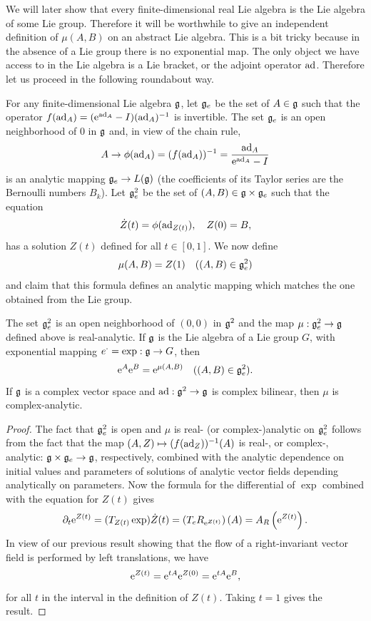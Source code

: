 We will later show that every finite-dimensional real Lie algebra is the Lie algebra of some Lie group. Therefore it will be worthwhile to give an independent definition of $\mu(A,B)$ on an abstract Lie algebra. This is a bit tricky because in the absence of a Lie group there is no exponential map. The only object we have access to in the Lie algebra is a Lie bracket, or the adjoint operator $\mathrm{ad}$. Therefore let us proceed in the following roundabout way.

For any finite-dimensional Lie algebra $\mathfrak{g}$, let $\mathfrak{g}_e$ be the set of $A\in \mathfrak{g}$ such that the operator $f(\mathrm{ad}_A)=(\mathrm{e}^{\mathrm{ad}_A}-I)(\mathrm{ad}_A)^{-1}$ is invertible. The set $\mathfrak{g}_e$ is an open neighborhood of $0$ in $\mathfrak{g}$ and, in view of the chain rule,
\[A\to \phi(\mathrm{ad}_A)=(f(\mathrm{ad}_A))^{-1}=\frac{\mathrm{ad}_A}{\mathrm{e}^{\mathrm{ad}_A}-I}\]
is an analytic mapping $\mathfrak{g}_e\to \boldsymbol{\mathrm{\mathrm}}{L}(\mathfrak{g})$ (the coefficients of its Taylor series are the Bernoulli numbers $B_k$). Let $\mathfrak{g}_e^2$ be the set of $(A,B)\in \mathfrak{g}\times\mathfrak{g}_e$ such that the equation
\[\dot Z(t)=\phi(\mathrm{ad}_{Z(t)}),\quad Z(0)=B,\label{eq Z(t)}\]
has a solution $Z(t)$ defined for all $t\in [0,1]$. We now define
\[\mu(A,B)=Z(1)\quad ((A,B)\in\mathfrak{g}_e^2) \label{def local mu}\]
and claim that this formula defines an analytic mapping which matches the one obtained from the Lie group.


\begin{thm}[{{\cite[Thm.~1.6.1]{DK}}}]
    The set $\mathfrak{g}_e^2$ is an open neighborhood of $(0,0)$ in $\mathfrak{g}^2$ and the map $\mu:\mathfrak{g}_e^2\to \mathfrak{g}$ defined above is real-analytic. If $\mathfrak{g}$ is the Lie algebra of a Lie group $G$, with exponential mapping $e^\cdot=\exp:\mathfrak{g}\to G$, then
    \[\mathrm{e}^A \mathrm{e}^B=\mathrm{e}^{\mu(A,B)}\quad ((A,B)\in\mathfrak{g}_e^2).\]
    If $\mathfrak{g}$ is a complex vector space and $\mathrm{ad}:\mathfrak{g}^2\to \mathfrak{g}$ is complex bilinear, then $\mu$ is complex-analytic.
\end{thm}
\begin{proof}
    The fact that $\mathfrak{g}_e^2$ is open and $\mu$ is real- (or complex-)analytic on $\mathfrak{g}_e^2$ follows from the fact that the map $(A,Z)\mapsto (f(\mathrm{ad}_Z))^{-1}(A)$ is real-, or complex-, analytic: $\mathfrak{g}\times\mathfrak{g}_e\to \mathfrak{g}$, respectively, combined with the analytic dependence on initial values and parameters of solutions of analytic vector fields depending analytically on parameters. Now the formula for the differential of $\exp$ combined with the equation for $Z(t)$ gives
    \[\partial_t \mathrm{e}^{Z(t)}=(T_{Z(t)}\exp )\dot Z(t)=\left(T_e R_{\mathrm{e}^{Z(t)}}\right)(A)=A_R\left(\mathrm{e}^{Z(t)}\right).\]
    In view of our previous result showing that the flow of a right-invariant vector field is performed by left translations, we have
    \[\mathrm{e}^{Z(t)}=\mathrm{e}^{tA}\mathrm{e}^{Z(0)}=\mathrm{e}^{tA}\mathrm{e}^B,\label{8284}\]
    for all $t$ in the interval in the definition of $Z(t)$. Taking $t=1$ gives the result.
\end{proof}

